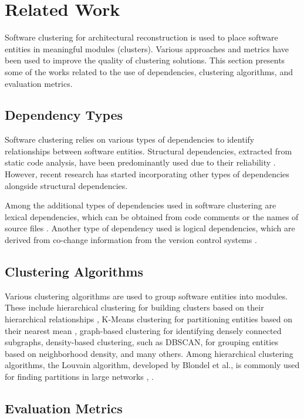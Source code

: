 \documentclass{ieeeaccess}
\begin{document}
\section{Related Work}
\label{sec:related_work}

Software clustering for architectural reconstruction is used to place software entities in meaningful modules (clusters). Various approaches and metrics have been used to improve the quality of clustering solutions. This section presents some of the works related to the use of dependencies, clustering algorithms, and evaluation metrics.

\subsection{Dependency Types}

Software clustering relies on various types of dependencies to identify relationships between software entities. Structural dependencies, extracted from static code analysis, have been predominantly used due to their reliability \cite{b12}. However, recent research has started incorporating other types of dependencies alongside structural dependencies.

Among the additional types of dependencies used in software clustering are lexical dependencies, which can be obtained from code comments \cite{b13} or the names of source files \cite{b14}. Another type of dependency used is logical dependencies, which are derived from co-change information from the version control systems \cite{b16}.

\subsection{Clustering Algorithms}

Various clustering algorithms are used to group software entities into modules. These include hierarchical clustering for building clusters based on their hierarchical relationships \cite{b12}, K-Means clustering for partitioning entities based on their nearest mean \cite{b17}, graph-based clustering for identifying densely connected subgraphs, density-based clustering, such as DBSCAN, for grouping entities based on neighborhood density, and many others. Among hierarchical clustering algorithms, the Louvain algorithm, developed by Blondel et al., is commonly used for finding partitions in large networks \cite{b8}, \cite{b9}.

\subsection{Evaluation Metrics}
\end{document}
